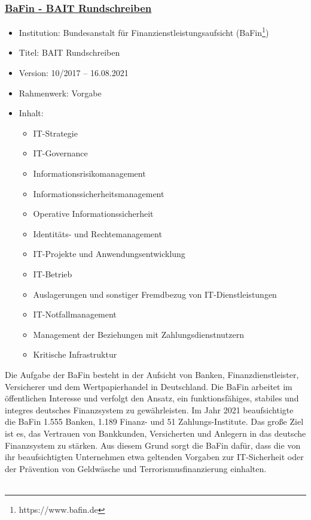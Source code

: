 \subsubsection{\underline{BaFin - BAIT Rundschreiben}}
\begin{itemize}
    \item Institution: Bundesanstalt für Finanzienstleistungsaufsicht (BaFin\footnote{https://www.bafin.de})
    \item Titel: BAIT Rundschreiben \autocite{bafin_rundschreiben}
    \item Version: 10/2017 – 16.08.2021
    \item Rahmenwerk: Vorgabe
    \item Inhalt:
    \begin{itemize}
        \item IT-Strategie 
        \item IT-Governance 
        \item Informationsrisikomanagement 
        \item Informationssicherheitsmanagement 
        \item Operative Informationssicherheit 
        \item Identitäts- und Rechtemanagement 
        \item IT-Projekte und Anwendungsentwicklung 
        \item IT-Betrieb 
        \item Auslagerungen und sonstiger Fremdbezug von IT-Dienstleistungen
        \item IT-Notfallmanagement 
        \item Management der Beziehungen mit Zahlungsdienstnutzern 
        \item Kritische Infrastruktur 
    \end{itemize}
\end{itemize}
\bigbreak
Die Aufgabe der BaFin besteht in der Aufsicht von Banken, Finanzdienstleister, Versicherer und dem Wertpapierhandel in Deutschland. Die BaFin arbeitet im öffentlichen Interesse und verfolgt den Ansatz, ein funktionsfähiges, stabiles und integres deutsches Finanzsystem zu gewährleisten. Im Jahr 2021 beaufsichtigte die BaFin 1.555 Banken, 1.189 Finanz- und 51 Zahlungs-Institute. Das große Ziel ist es, das Vertrauen von Bankkunden, Versicherten und Anlegern in das deutsche Finanzsystem zu stärken. Aus diesem Grund sorgt die BaFin dafür, dass die von ihr beaufsichtigten Unternehmen etwa geltenden Vorgaben zur IT-Sicherheit oder der Prävention von Geldwäsche und Terrorismusfinanzierung einhalten. \autocite{DieBafin}\\\\

